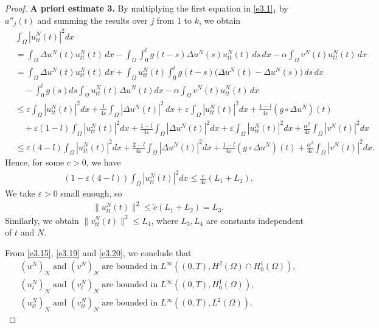 \documentclass[10pt,a4paper]{amsart}
\numberwithin{equation}{section}
\begin{document}
\begin{proof}
\noindent\textbf{A priori estimate 3.}
 By multiplying the first equation in \eqref{e3.1}$_1$ by
 \(a''_j(t)\) and summing the results over \(j\) from 1 to \(k\), we obtain
\begin{align*}
&\int_\Omega |u_{tt}^N(t)|^2 dx \\
& = \int_\Omega \Delta u^N(t) u_{tt}^N(t) \, dx
 - \int_\Omega \int_0^t g(t-s) \Delta u^N(s) u_{tt}^N(t) \, ds\,dx
 - \alpha \int_\Omega v^N(t) u_{tt}^N(t) \, dx\\
& = \int_\Omega \Delta u^N(t) u_{tt}^N(t) \, dx
 + \int_\Omega u_{tt}^N(t) \int_0^t g(t-s) \Big(\Delta u^N(t)- \Delta u^N(s)\Big)\, ds\,dx\\
&\quad -\int_0^t g(s) ds \int_\Omega u_{tt}^N(t) \Delta u^N(t) dx
 - \alpha \int_\Omega v^N(t) u_{tt}^N(t) \, dx\\
&\leq \varepsilon \int_\Omega |u_{tt}^N(t)|^2 dx
 +\frac{1}{4\varepsilon}\int_\Omega |\Delta u^N(t)|^2 \, dx
 + \varepsilon \int_\Omega |u_{tt}^N(t)|^2 dx+\frac{1-l}{4\varepsilon}
 (g \circ \Delta u^N)(t)\\
&\quad +\varepsilon(1-l) \int_\Omega |u_{tt}^N(t)|^2 dx
 + \frac{1-l}{4\varepsilon} \int_\Omega |\Delta u^N(t)|^2dx
 + \varepsilon \int_\Omega |u_{tt}^N(t)|^2 dx
 +\frac{\alpha^2}{4\varepsilon}\int_\Omega |v^N(t)|^2 dx \\
&\leq \varepsilon (4-l)\int_\Omega |u_{tt}^N(t)|^2 dx
 +\frac{2-l}{4\varepsilon} \int_\Omega |\Delta u^N(t)|^2dx+
 \frac{1-l}{4\varepsilon} (g \circ \Delta u^N)(t)
 +\frac{\alpha^2}{4\varepsilon}\int_\Omega |v^N(t)|^2 dx.
\end{align*}
Hence, for some $c >0$, we have
\begin{align}
\left(1-\varepsilon(4-l)\right) \int_\Omega |u_{tt}^N(t)|^2 dx
\leq \frac{c}{4\varepsilon}(L_1+L_2).
\end{align}
We take $\varepsilon >0$ small enough, so
\begin{align}
\|u_{tt}^N(t)\|^2 \leq \tilde{c}(L_1+L_2)=L_3. \label{e3.20}
\end{align}
Similarly, we obtain $\|v_{tt}^N(t)\|^2 \leq L_4$, where $L_{3}, L_{4} $
are constants independent of $t$ and $N$.

From \eqref{e3.15}, \eqref{e3.19} and \eqref{e3.20}, we conclude that
\begin{equation} \label{e3.21}
\begin{gathered}
(u^{N})_{N} \text{ and } (v^N)_{N} \text{ are bounded in }
L^\infty((0,T), H^2(\Omega) \cap H_0^1 (\Omega)),\\
(u^N_{t})_{N} \text{ and } (v^N_{t})_{N} \text{ are bounded in }
L^\infty((0,T), H^1_0(\Omega)), \\
(u^N_{tt})_{N} \text{ and } (v^N_{tt})_{N} \text{ are bounded in }
 L^\infty((0,T), L^2(\Omega)).
\end{gathered}
\end{equation}


\end{proof}
\end{document}

